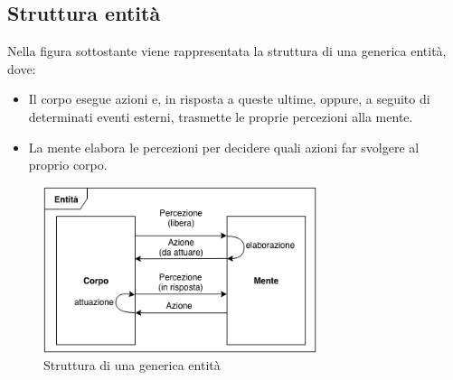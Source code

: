 \subsection{Struttura entità}
Nella figura sottostante viene rappresentata la struttura di una generica entità, dove:

\begin{itemize}
   \item Il corpo esegue azioni e, in risposta a queste ultime, oppure, a seguito di determinati eventi esterni, trasmette le proprie percezioni alla mente.
   \item La mente elabora le percezioni per decidere quali azioni far svolgere al proprio corpo.
\end{itemize}

\begin{figure}[H]
   \centering
   \includegraphics[width=8cm]{figures/Entita_struttura.png}
   \caption{Struttura di una generica entità}
\end{figure}
